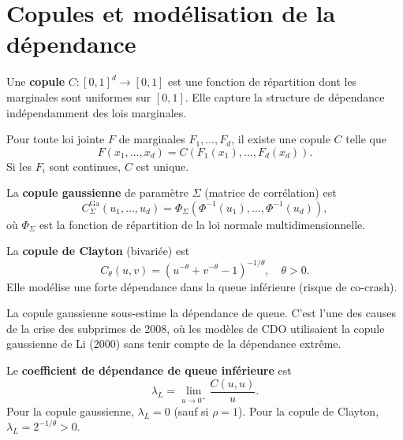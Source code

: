 \section{Copules et mod\'elisation de la d\'ependance}

\begin{definition}[Copule]
Une \textbf{copule} $C : [0,1]^d \to [0,1]$ est une fonction de r\'epartition
dont les marginales sont uniformes sur $[0,1]$. Elle capture la structure de
d\'ependance ind\'ependamment des lois marginales.
\end{definition}

\begin{theoreme}[Sklar, 1959]
Pour toute loi jointe $F$ de marginales $F_1, \ldots, F_d$, il existe une
copule $C$ telle que
\[
    F(x_1, \ldots, x_d) = C(F_1(x_1), \ldots, F_d(x_d)).
\]
Si les $F_i$ sont continues, $C$ est unique.
\end{theoreme}

\begin{exemple}
La \textbf{copule gaussienne} de param\`etre $\Sigma$ (matrice de corr\'elation) est
\[
    C_\Sigma^{\mathrm{Ga}}(u_1, \ldots, u_d)
    = \Phi_\Sigma(\Phi^{-1}(u_1), \ldots, \Phi^{-1}(u_d)),
\]
o\`u $\Phi_\Sigma$ est la fonction de r\'epartition de la loi normale
multidimensionnelle.
\end{exemple}

\begin{definition}
La \textbf{copule de Clayton} (bivari\'ee) est
\[
    C_\theta(u, v) = \left(u^{-\theta} + v^{-\theta} - 1\right)^{-1/\theta},
    \quad \theta > 0.
\]
Elle mod\'elise une forte d\'ependance dans la queue inf\'erieure (risque de
co-crash).
\end{definition}

\begin{remarque}
La copule gaussienne sous-estime la d\'ependance de queue. C'est l'une des
causes de la crise des subprimes de 2008, o\`u les mod\`eles de CDO
utilisaient la copule gaussienne de Li (2000) sans tenir compte de la
d\'ependance extr\^eme.
\end{remarque}

\begin{definition}
Le \textbf{coefficient de d\'ependance de queue inf\'erieure} est
\[
    \lambda_L = \lim_{u \to 0^+} \frac{C(u, u)}{u}.
\]
Pour la copule gaussienne, $\lambda_L = 0$ (sauf si $\rho = 1$).
Pour la copule de Clayton, $\lambda_L = 2^{-1/\theta} > 0$.
\end{definition}

